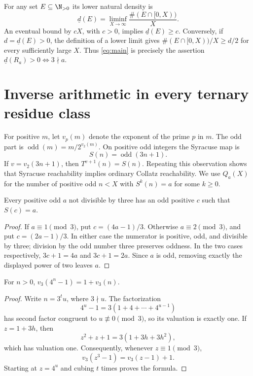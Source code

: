 For any set $E\subseteq\N_{>0}$ its lower natural density is
\[
 \underline d(E)=\liminf_{X\to\infty}\frac{\#(E\cap[0,X))}{X}.
\]
An eventual bound by $cX$, with $c>0$, implies $\underline d(E)\ge c$.
Conversely, if $d=\underline d(E)>0$, the definition of a lower limit
gives $\#(E\cap[0,X))/X\ge d/2$ for every sufficiently large $X$.
Thus \eqref{eq:main} is precisely the assertion
$\underline d(R_a)>0\iff3\nmid a$.

\section{Inverse arithmetic in every ternary residue class}
For positive $m$, let $v_p(m)$ denote the exponent of the prime $p$ in $m$.
The odd part is $\operatorname{odd}(m)=m/2^{v_2(m)}$. On positive odd
integers the Syracuse map is
\begin{equation}\label{eq:S}
 S(n)=\operatorname{odd}(3n+1).
\end{equation}
If $v=v_2(3n+1)$, then $T^{v+1}(n)=S(n)$. Repeating this observation
shows that Syracuse reachability implies ordinary Collatz reachability.
We use $Q_a(X)$ for the number of positive odd $n<X$ with $S^k(n)=a$
for some $k\ge0$.

\begin{lemma}\label{lem:child}
Every positive odd $a$ not divisible by three has an odd positive $c$
such that $S(c)=a$.
\end{lemma}
\begin{proof}
If $a\equiv1\pmod3$, put $c=(4a-1)/3$. Otherwise $a\equiv2\pmod3$,
and put $c=(2a-1)/3$. In either case the numerator is positive, odd,
and divisible by three; division by the odd number three preserves
oddness. In the two cases respectively,
$3c+1=4a$ and $3c+1=2a$. Since $a$ is odd, removing exactly the displayed
power of two leaves $a$.
\end{proof}

\begin{lemma}\label{lem:valuation}
For $n>0$, $v_3(4^n-1)=1+v_3(n)$.
\end{lemma}
\begin{proof}
Write $n=3^t u$, where $3\nmid u$. The factorization
\[
 4^u-1=3(1+4+\cdots+4^{u-1})
\]
has second factor congruent to $u\not\equiv0\pmod3$, so its valuation
is exactly one. If $z=1+3h$, then
\[
 z^2+z+1=3(1+3h+3h^2),
\]
which has valuation one. Consequently, whenever $z\equiv1\pmod3$,
\[
 v_3(z^3-1)=v_3(z-1)+1.
\]
Starting at $z=4^u$ and cubing $t$ times proves the formula.
\end{proof}

